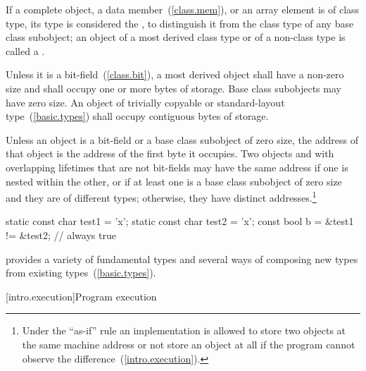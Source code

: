 \pnum
If a complete object, a data member~(\ref{class.mem}), or an array element is of
class type, its type is considered the , to distinguish it from the class type of any base class subobject;
an object of a most derived class type or of a non-class type is called a
.

\pnum
{}%
Unless it is a bit-field~(\ref{class.bit}), a most derived object shall have a
non-zero size and shall occupy one or more bytes of storage. Base class
subobjects may have zero size. An object of trivially copyable or
standard-layout type~(\ref{basic.types}) shall occupy contiguous bytes of
storage.

\pnum
{}%
%
Unless an object is a bit-field or a base class subobject of zero size, the
address of that object is the address of the first byte it occupies.
Two objects  and 
with overlapping lifetimes
that are not bit-fields
may have the same address
if one is nested within the other,
or
if at least one is a base class subobject of zero size
and they are of different types;
otherwise, they have distinct addresses.\footnote{Under the ``as-if'' rule an
implementation is allowed to store two objects at the same machine address or
not store an object at all if the program cannot observe the
difference~(\ref{intro.execution}).}

\begin{example}
\begin{codeblock}
static const char test1 = 'x';
static const char test2 = 'x';
const bool b = &test1 != &test2;      // always true
\end{codeblock}
\end{example}

\pnum
\begin{note} 
\Cpp  provides a variety of fundamental types and several ways of composing
new types from existing types~(\ref{basic.types}).
\end{note}%

[intro.execution]{Program execution}

